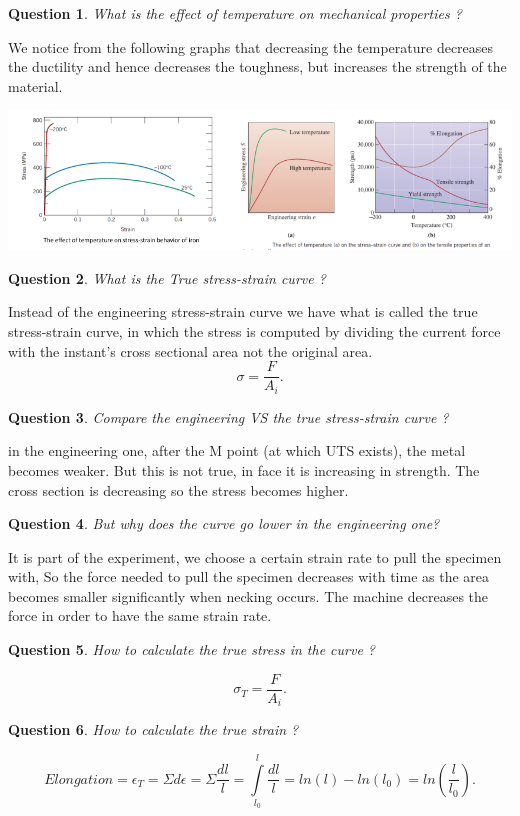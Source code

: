 \documentclass[13]{article}
\newtheorem{exer}{Question}
\begin{document}
\begin{exer}
What is the effect of temperature on mechanical properties ?
\end{exer}
We notice from the following graphs that decreasing the temperature decreases the ductility and hence decreases the toughness, but increases the strength of the material.
\begin{center}
\includegraphics[scale=0.5]{figures/7.png}
\end{center}
\begin{exer}
What is the True stress-strain curve ?
\end{exer}
Instead of the engineering stress-strain curve we have what is called the true stress-strain curve, in which the stress is computed by dividing the current force with the instant's cross sectional area not the original area.
\[
\sigma = \frac{F}{A_i}
.\] 
\begin{exer}
Compare the engineering VS the true stress-strain curve ?
\end{exer}
in the engineering one, after the M point (at which UTS exists), the metal becomes weaker. But this is not true, in face it is increasing in strength. The cross section is decreasing so the stress becomes higher.\\
\begin{exer}
But why does the curve go lower in the engineering one? 
\end{exer}
It is part of the experiment, we choose a certain strain rate to pull the specimen with, So the force needed to pull the specimen decreases with time as the area becomes smaller significantly when necking occurs. The machine decreases the force in order to have the same strain rate.
\begin{exer}
How to calculate the true stress in the curve ?
\end{exer}
\[
\sigma_T = \frac{F}{A_i} 
.\] 
\begin{exer}
How to calculate the true strain ?
\end{exer}
\[
	Elongation = \epsilon_T = \Sigma d\epsilon = \Sigma \frac{dl}{l}=\int \limits_{l_0}^{l} \frac{dl}{l} = ln(l)-ln(l_0) = ln( \frac{l}{l_0})  
.\] 
\end{document}
